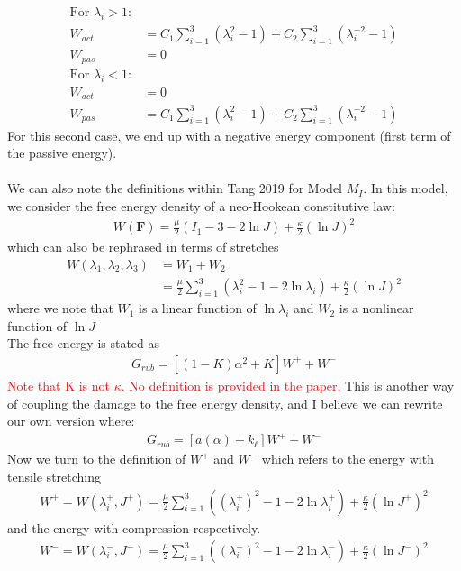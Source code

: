 \documentclass[12pt,3p]{article}
\numberwithin{equation}{section}
\begin{document}
\begin{align*}
\text{For } \lambda_i > 1: &\\
W_{act} &= C_1 \sum_{i = 1}^{3} (\lambda_i^2 - 1) + C_2 \sum_{i=1}^3 (\lambda_i^{-2} - 1) \\
W_{pas} &= 0 \\
\text{For } \lambda_i < 1: &\\
W_{act} &= 0 \\
W_{pas} &= C_1 \sum_{i = 1}^{3} (\lambda_i^2 - 1) + C_2 \sum_{i=1}^3 (\lambda_i^{-2} - 1) 
\end{align*} 
For this second case, we end up with a negative energy component (first term of the passive energy). \\ \\
We can also note the definitions within Tang 2019 for Model $M_I$. In this model, we consider the free energy density of a neo-Hookean constitutive law:
\begin{align*}
W (\mathbf{F}) = \frac{\mu}{2} (I_1 -3 - 2 \ln J) + \frac{\kappa}{2} (\ln J)^2
\end{align*}
which can also be rephrased in terms of stretches
\begin{align*}
W(\lambda_1, \lambda_2, \lambda_3) &= W_1 + W_2 \\
		&= \frac{\mu}{2} \sum_{i = 1}^3 (\lambda_i^2 - 1 - 2 \ln \lambda_i) + \frac{\kappa}{2} (\ln J)^2
\end{align*}
where we note that $W_1$ is a linear function of $\ln \lambda_i$ and $W_2$ is a nonlinear function of $\ln J$ \\
The free energy is stated as 
\begin{align*}
G_{rub} = [(1- K) \alpha^2 + K] W^+ + W^-
\end{align*}
\textcolor{red}{Note that K is not $\kappa$. No definition is provided in the paper.} This is another way of coupling the damage to the free energy density, and I believe we can rewrite our own version where:
\begin{align*}
G_{rub} = [a (\alpha) + k_{\ell}] W^+ + W^-
\end{align*}
Now we turn to the definition of $W^+$ and $W^-$ which refers to the energy with tensile stretching
\begin{align*}
W^+ = W(\lambda_i^+, J^+) = \frac{\mu}{2} \sum_{i = 1}^3 ( (\lambda_i^+)^2 - 1 - 2 \ln \lambda_i^+) + \frac{\kappa}{2} (\ln J^+)^2
\end{align*}
and the energy with compression respectively.
\begin{align*}
W^- = W(\lambda_i^-, J^-) = \frac{\mu}{2} \sum_{i = 1}^3 ( (\lambda_i^-)^2 - 1 - 2 \ln \lambda_i^-) + \frac{\kappa}{2} (\ln J^-)^2
\end{align*}
\end{document}
